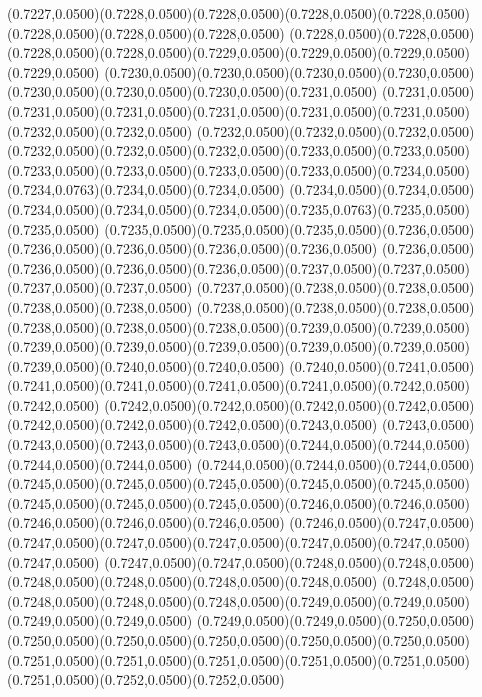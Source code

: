 (0.7227,0.0500)(0.7228,0.0500)(0.7228,0.0500)(0.7228,0.0500)(0.7228,0.0500)(0.7228,0.0500)(0.7228,0.0500)(0.7228,0.0500)
(0.7228,0.0500)(0.7228,0.0500)(0.7228,0.0500)(0.7228,0.0500)(0.7229,0.0500)(0.7229,0.0500)(0.7229,0.0500)(0.7229,0.0500)
(0.7230,0.0500)(0.7230,0.0500)(0.7230,0.0500)(0.7230,0.0500)(0.7230,0.0500)(0.7230,0.0500)(0.7230,0.0500)(0.7231,0.0500)
(0.7231,0.0500)(0.7231,0.0500)(0.7231,0.0500)(0.7231,0.0500)(0.7231,0.0500)(0.7231,0.0500)(0.7232,0.0500)(0.7232,0.0500)
(0.7232,0.0500)(0.7232,0.0500)(0.7232,0.0500)(0.7232,0.0500)(0.7232,0.0500)(0.7232,0.0500)(0.7233,0.0500)(0.7233,0.0500)
(0.7233,0.0500)(0.7233,0.0500)(0.7233,0.0500)(0.7233,0.0500)(0.7234,0.0500)(0.7234,0.0763)(0.7234,0.0500)(0.7234,0.0500)
(0.7234,0.0500)(0.7234,0.0500)(0.7234,0.0500)(0.7234,0.0500)(0.7234,0.0500)(0.7235,0.0763)(0.7235,0.0500)(0.7235,0.0500)
(0.7235,0.0500)(0.7235,0.0500)(0.7235,0.0500)(0.7236,0.0500)(0.7236,0.0500)(0.7236,0.0500)(0.7236,0.0500)(0.7236,0.0500)
(0.7236,0.0500)(0.7236,0.0500)(0.7236,0.0500)(0.7236,0.0500)(0.7237,0.0500)(0.7237,0.0500)(0.7237,0.0500)(0.7237,0.0500)
(0.7237,0.0500)(0.7238,0.0500)(0.7238,0.0500)(0.7238,0.0500)(0.7238,0.0500)
\PST@Solid(0.7238,0.0500)(0.7238,0.0500)(0.7238,0.0500)(0.7238,0.0500)(0.7238,0.0500)(0.7238,0.0500)(0.7239,0.0500)(0.7239,0.0500)
(0.7239,0.0500)(0.7239,0.0500)(0.7239,0.0500)(0.7239,0.0500)(0.7239,0.0500)(0.7239,0.0500)(0.7240,0.0500)(0.7240,0.0500)
(0.7240,0.0500)(0.7241,0.0500)(0.7241,0.0500)(0.7241,0.0500)(0.7241,0.0500)(0.7241,0.0500)(0.7242,0.0500)(0.7242,0.0500)
(0.7242,0.0500)(0.7242,0.0500)(0.7242,0.0500)(0.7242,0.0500)(0.7242,0.0500)(0.7242,0.0500)(0.7242,0.0500)(0.7243,0.0500)
(0.7243,0.0500)(0.7243,0.0500)(0.7243,0.0500)(0.7243,0.0500)(0.7244,0.0500)(0.7244,0.0500)(0.7244,0.0500)(0.7244,0.0500)
(0.7244,0.0500)(0.7244,0.0500)(0.7244,0.0500)(0.7245,0.0500)(0.7245,0.0500)(0.7245,0.0500)(0.7245,0.0500)(0.7245,0.0500)
(0.7245,0.0500)(0.7245,0.0500)(0.7245,0.0500)(0.7246,0.0500)(0.7246,0.0500)(0.7246,0.0500)(0.7246,0.0500)(0.7246,0.0500)
(0.7246,0.0500)(0.7247,0.0500)(0.7247,0.0500)(0.7247,0.0500)(0.7247,0.0500)(0.7247,0.0500)(0.7247,0.0500)(0.7247,0.0500)
(0.7247,0.0500)(0.7247,0.0500)(0.7248,0.0500)(0.7248,0.0500)(0.7248,0.0500)(0.7248,0.0500)(0.7248,0.0500)(0.7248,0.0500)
(0.7248,0.0500)(0.7248,0.0500)(0.7248,0.0500)(0.7248,0.0500)(0.7249,0.0500)(0.7249,0.0500)(0.7249,0.0500)(0.7249,0.0500)
(0.7249,0.0500)(0.7249,0.0500)(0.7250,0.0500)(0.7250,0.0500)(0.7250,0.0500)(0.7250,0.0500)(0.7250,0.0500)(0.7250,0.0500)
(0.7251,0.0500)(0.7251,0.0500)(0.7251,0.0500)(0.7251,0.0500)(0.7251,0.0500)(0.7251,0.0500)(0.7252,0.0500)(0.7252,0.0500)
